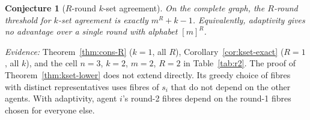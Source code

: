 \documentclass[11pt]{article}
\newtheorem{conjecture}[theorem]{Conjecture}
\begin{document}
\begin{conjecture}[$R$-round $k$-set agreement]\label{conj:kset-R}
On the complete graph, the $R$-round threshold for $k$-set agreement is exactly $m^R+k-1$. Equivalently, adaptivity gives no advantage over a single round with alphabet $[m]^R$.
\end{conjecture}
\noindent\emph{Evidence:} Theorem~\ref{thm:cons-R} ($k=1$, all $R$), Corollary~\ref{cor:kset-exact} ($R=1$, all $k$), and the cell $n=3$, $k=2$, $m=2$, $R=2$ in Table~\ref{tab:r2}. The proof of Theorem~\ref{thm:kset-lower} does not extend directly. Its greedy choice of fibres with distinct representatives uses fibres of $s_i$ that do not depend on the other agents. With adaptivity, agent $i$'s round-2 fibres depend on the round-1 fibres chosen for everyone else.

\end{document}
